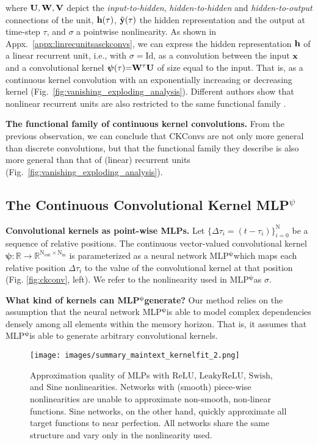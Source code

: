 \documentclass{article}
\def\sR{{\mathbb{R}}}
\newcommand{\mat}[1]{\ensuremath{{\mathbf{\MakeUppercase{{#1}}}}}}
\renewcommand{\vec}[1]{\ensuremath{\mathbf{\MakeLowercase{{#1}}}}}
\newcommand{\Wm}{\mat{W}}
\newcommand{\Vm}{\mat{V}}
\newcommand{\Um}{\mat{U}}
\newcommand{\xv}{\vec{x}}
\newcommand{\yv}{\vec{y}}
\newcommand{\hv}{\vec{h}}
\def\Nt{\mathrm{N}}
\def\sR{{\mathbb{R}}}
\def\bpsi{{\boldsymbol{\psi}}}
\newcommand{\mlp}{{\btt MLP}}
\newcommand{\mlppsi}{\mlp$^{\bpsi}$}
\begin{document}
where $\Um, \Wm, \Vm$ depict the \textit{input-to-hidden}, \textit{hidden-to-hidden} and \textit{hidden-to-output} connections of the unit, $\hv(\tau)$,  $\tilde{\yv}(\tau)$ the hidden representation and the output at time-step $\tau$, and $\sigma$ a pointwise nonlinearity. As shown in Appx.~\ref{appx:linrecunitsasckconvs}, we can express the hidden representation $\hv$ of a linear recurrent unit, i.e., with $\sigma{=}\mathrm{Id}$, as a convolution between the input $\xv$ and a convolutional kernel $\boldsymbol{\psi}(\tau) {=} \Wm^{\tau} \Um$ of size equal to the input. That is, as a continuous kernel convolution with an exponentially increasing or decreasing kernel (Fig.~\ref{fig:vanishing_exploding_analysis}). Different authors show that nonlinear recurrent units are also restricted to the same functional family \citep{pascanu2013difficulty, arjovsky2016unitary, zhao2020rnn}.

\textbf{The functional family of continuous kernel convolutions.} From the previous observation, we can conclude that CKConvs are not only more general than discrete convolutions, but that the functional family they describe is also more general than that of (linear) recurrent units (Fig.~\ref{fig:vanishing_exploding_analysis}).
\vspace{-2mm}
\subsection{The Continuous Convolutional Kernel {\btt MLP}$^{\psi}$}\label{sec:ckconvkernel}
\vspace{-2mm}
\textbf{Convolutional kernels as point-wise \mlp s.} Let $\{\Delta\tau_{i}{=}(t {-} \tau_{i})\}_{i= 0}^{\Nt}$ be a sequence of relative positions. The continuous vector-valued convolutional kernel $\boldsymbol{\psi}: \sR \rightarrow \sR^{\mathrm{N_{out}}\times \mathrm{N_{in}}}$ is parameterized as a neural network \mlppsi which maps each relative position $\Delta\tau_{i}$ to the value of the convolutional kernel at that position (Fig. \ref{fig:ckconv}, left). We refer to the nonlinearity used in \mlppsi as $\sigma$.


\textbf{What kind of kernels can \mlppsi generate?} Our method relies on the assumption that the neural network \mlppsi is able to model complex dependencies densely among all elements within the memory horizon. That is, it assumes that \mlppsi is able to generate arbitrary convolutional kernels.
\begin{figure}
    \centering
    \texttt{[image: images/summary\_maintext\_kernelfit\_2.png]}
    \vspace{-2mm}
    \caption{Approximation quality of \mlp s with $\mathrm{ReLU}$, $\mathrm{LeakyReLU}$, $\mathrm{Swish}$, and $\mathrm{Sine}$ nonlinearities. Networks with (smooth) piece-wise nonlinearities are unable to approximate non-smooth, non-linear functions. $\mathrm{Sine}$ networks, on the other hand, quickly approximate all target functions to near perfection. All networks share the same structure and vary only in the nonlinearity used.
    \vspace{-3.5mm}}
    \label{fig:summary_maintext_kernelfit}
\end{figure}
\end{document}
